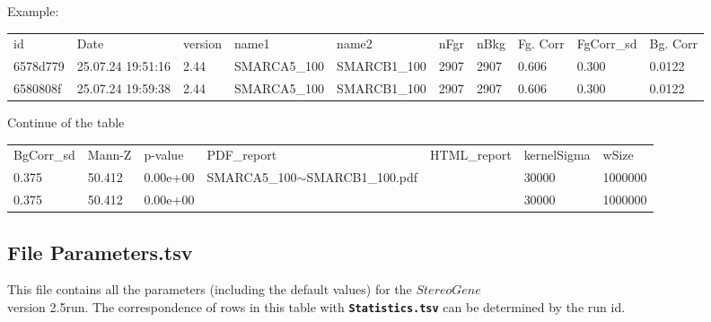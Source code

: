 \documentclass{article}
\newcommand{\tw}{\textwidth}
\newcommand{\prm}[1]{\texttt{\textbf{{#1}}}}
\newcommand{\sg}{$StereoGene$\\ version 2.5}
\begin{document}
Example:

\begin{minipage}{0.95\tw}
\begin{shaded}
\begin{scriptsize}
\begin{tabular}{llllllllll}
id       & Date              & version & name1       & name2       & nFgr & nBkg & Fg. Corr & FgCorr\_sd & Bg. Corr\\
6578d779 & 25.07.24 19:51:16 & 2.44    & SMARCA5\_100 & SMARCB1\_100 & 2907 & 2907 & 0.606    & 0.300    & 0.0122  \\
6580808f & 25.07.24 19:59:38 & 2.44    & SMARCA5\_100 & SMARCB1\_100 & 2907 & 2907 & 0.606    & 0.300    & 0.0122  \\
\end{tabular}
\end{scriptsize}
\end{shaded}
\end{minipage} 

Continue of the table


\begin{flushright}
\begin{minipage}{0.85\tw}
\begin{shaded} 
\begin{scriptsize}
\begin{tabular}{lllllll}
 BgCorr\_sd & Mann-Z & p-value  & PDF\_report                   & HTML\_report & kernelSigma & wSize  \\
 0.375      & 50.412 & 0.00e+00 & SMARCA5\_100$\sim$SMARCB1\_100.pdf &              & 30000       & 1000000\\
 0.375      & 50.412 & 0.00e+00 &                               &              & 30000       & 1000000\\
\end{tabular}
\end{scriptsize}
\end{shaded}
\end{minipage} 

\end{flushright}


\subsection{File Parameters.tsv}
This file contains all the parameters (including the default values) for the \sg run. 
The correspondence of rows in this table with \prm{Statistics.tsv} can be determined by the run id.
\end{document}
